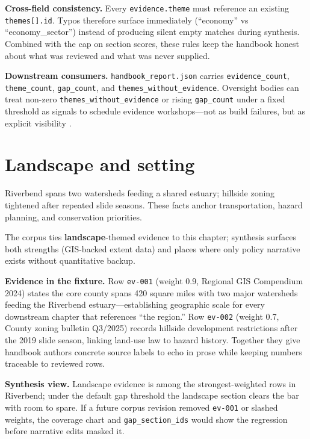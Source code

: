 \documentclass[
]{article}
\begin{document}
\textbf{Cross-field consistency.} Every \texttt{evidence.theme} must
reference an existing \texttt{themes{[}{]}.id}. Typos therefore surface
immediately (``economy'' vs ``economy\_sector'') instead of producing
silent empty matches during synthesis. Combined with the cap on section
scores, these rules keep the handbook honest about what was reviewed and
what was never supplied.

\textbf{Downstream consumers.} \texttt{handbook\_report.json} carries
\texttt{evidence\_count}, \texttt{theme\_count}, \texttt{gap\_count},
and \texttt{themes\_without\_evidence}. Oversight bodies can treat
non-zero \texttt{themes\_without\_evidence} or rising
\texttt{gap\_count} under a fixed threshold as signals to schedule
evidence workshops---not as build failures, but as explicit visibility
\citep{template2026}.

\newpage

\section{Landscape and setting}\label{landscape-and-setting}

Riverbend spans two watersheds feeding a shared estuary; hillside zoning
tightened after repeated slide seasons. These facts anchor
transportation, hazard planning, and conservation priorities.

The corpus ties \textbf{landscape}-themed evidence to this chapter;
synthesis surfaces both strengths (GIS-backed extent data) and places
where only policy narrative exists without quantitative backup.

\textbf{Evidence in the fixture.} Row \texttt{ev-001} (weight 0.9,
Regional GIS Compendium 2024) states the core county spans 420 square
miles with two major watersheds feeding the Riverbend
estuary---establishing geographic scale for every downstream chapter
that references ``the region.'' Row \texttt{ev-002} (weight 0.7, County
zoning bulletin Q3/2025) records hillside development restrictions after
the 2019 slide season, linking land-use law to hazard history. Together
they give handbook authors concrete source labels to echo in prose while
keeping numbers traceable to reviewed rows.

\textbf{Synthesis view.} Landscape evidence is among the
strongest-weighted rows in Riverbend; under the default gap threshold
the landscape section clears the bar with room to spare. If a future
corpus revision removed \texttt{ev-001} or slashed weights, the coverage
chart and \texttt{gap\_section\_ids} would show the regression before
narrative edits masked it.
\end{document}
